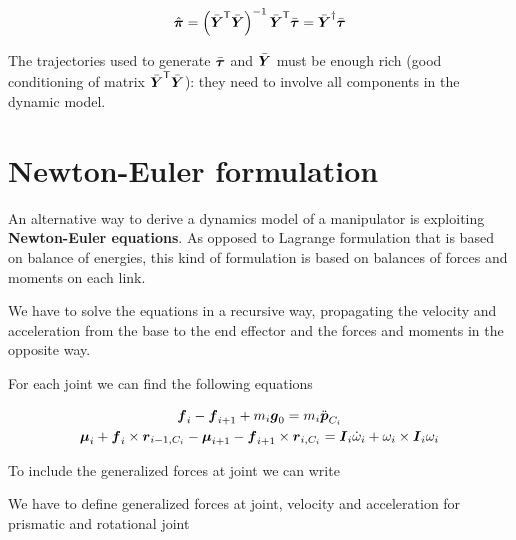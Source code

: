 \[
	\hat{\boldsymbol{\pi}} = \left(\bar{\boldsymbol{Y}}^{\mathsf{T}} \bar{\boldsymbol{Y}}\right)^{-1} \bar{\boldsymbol{Y}}^{\mathsf{T}} \bar{\boldsymbol{\tau}}
	= \bar{\boldsymbol{Y}}^\dag \bar{\boldsymbol{\tau}}
\]

The trajectories used to generate $\bar{\boldsymbol{\tau}}$ and $\bar{\boldsymbol{Y}}$ must be enough rich (good conditioning of matrix $\bar{\boldsymbol{Y}}^{\mathsf{T}} \bar{\boldsymbol{Y}}$): they need to involve all components in the dynamic model.

\section{Newton-Euler formulation}

An alternative way to derive a dynamics model of a manipulator is exploiting \textbf{Newton-Euler equations}.
As opposed to Lagrange formulation that is based on balance of energies, this kind of formulation is based on balances of forces and moments on each link.

We have to solve the equations in a recursive way, propagating the velocity and acceleration from the base to the end effector and the forces and moments in the opposite way.

For each joint we can find the following equations

\begin{gather*}
    \boldsymbol{f}_i - \boldsymbol{f}_{i+1} + m_i \boldsymbol{g}_0 = m_i \ddot{\boldsymbol{p}}_{C_i} \\
    \boldsymbol{\mu}_i + \boldsymbol{f}_i \times \boldsymbol{r}_{i-1,C_i} - \boldsymbol{\mu}_{i+1} - \boldsymbol{f}_{i+1} \times \boldsymbol{r}_{i,C_i} = \boldsymbol{I}_i \dot{\omega}_i + \omega_i \times \boldsymbol{I}_i \omega_i
\end{gather*}

To include the generalized forces at joint we can write

We have to define generalized forces at joint, velocity and acceleration for prismatic and rotational joint

